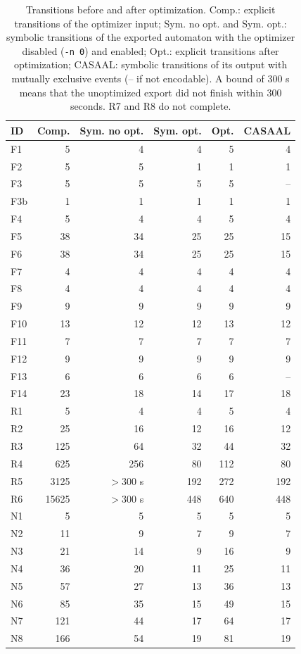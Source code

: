\begin{table}[t]
\centering
\caption{Transitions before and after optimization. Comp.: explicit transitions of the optimizer input; Sym. no opt. and Sym. opt.: symbolic transitions of the exported automaton with the optimizer disabled (\texttt{-n 0}) and enabled; Opt.: explicit transitions after optimization; CASAAL: symbolic transitions of its output with mutually exclusive events (-- if not encodable). A bound of 300 s means that the unoptimized export did not finish within 300 seconds. R7 and R8 do not complete.}
\label{tab:symbolic-before-after}
\scriptsize
\setlength{\tabcolsep}{4pt}
\begin{tabular}{@{}lrrrrr@{}}
\toprule
ID & Comp. & Sym. no opt. & Sym. opt. & Opt. & CASAAL\\
\midrule
F1 & 5 & 4 & 4 & 5 & 4\\
F2 & 5 & 5 & 1 & 1 & 1\\
F3 & 5 & 5 & 5 & 5 & --\\
F3b & 1 & 1 & 1 & 1 & 1\\
F4 & 5 & 4 & 4 & 5 & 4\\
F5 & 38 & 34 & 25 & 25 & 15\\
F6 & 38 & 34 & 25 & 25 & 15\\
F7 & 4 & 4 & 4 & 4 & 4\\
F8 & 4 & 4 & 4 & 4 & 4\\
F9 & 9 & 9 & 9 & 9 & 9\\
F10 & 13 & 12 & 12 & 13 & 12\\
F11 & 7 & 7 & 7 & 7 & 7\\
F12 & 9 & 9 & 9 & 9 & 9\\
F13 & 6 & 6 & 6 & 6 & --\\
F14 & 23 & 18 & 14 & 17 & 18\\
R1 & 5 & 4 & 4 & 5 & 4\\
R2 & 25 & 16 & 12 & 16 & 12\\
R3 & 125 & 64 & 32 & 44 & 32\\
R4 & 625 & 256 & 80 & 112 & 80\\
R5 & 3125 & $>$300 s & 192 & 272 & 192\\
R6 & 15625 & $>$300 s & 448 & 640 & 448\\
N1 & 5 & 5 & 5 & 5 & 5\\
N2 & 11 & 9 & 7 & 9 & 7\\
N3 & 21 & 14 & 9 & 16 & 9\\
N4 & 36 & 20 & 11 & 25 & 11\\
N5 & 57 & 27 & 13 & 36 & 13\\
N6 & 85 & 35 & 15 & 49 & 15\\
N7 & 121 & 44 & 17 & 64 & 17\\
N8 & 166 & 54 & 19 & 81 & 19\\
\bottomrule
\end{tabular}
\end{table}
